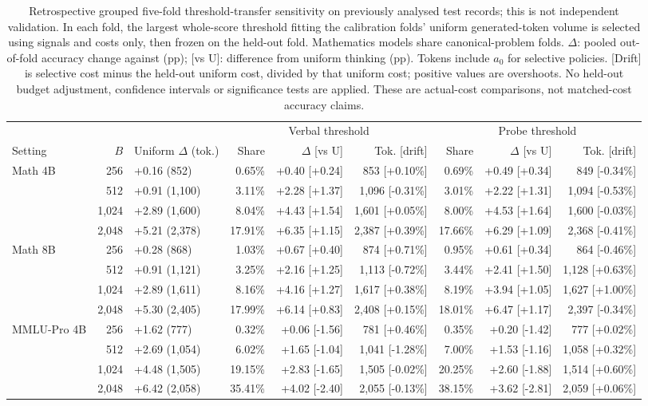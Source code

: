 \begin{table}[t]
\centering\scriptsize
\setlength{\tabcolsep}{3pt}
\begin{tabular}{lrlrrrrrr}
\toprule
& & & \multicolumn{3}{c}{Verbal threshold} & \multicolumn{3}{c}{Probe threshold} \\
\cmidrule(lr){4-6}\cmidrule(lr){7-9}
Setting & $B$ & Uniform $\Delta$ (tok.) & Share & $\Delta$ [vs U] & Tok. [drift] & Share & $\Delta$ [vs U] & Tok. [drift] \\
\midrule
Math 4B & 256 & +0.16 (852) & 0.65\% & +0.40 [+0.24] & 853 [+0.10\%] & 0.69\% & +0.49 [+0.34] & 849 [-0.34\%] \\
 & 512 & +0.91 (1,100) & 3.11\% & +2.28 [+1.37] & 1,096 [-0.31\%] & 3.01\% & +2.22 [+1.31] & 1,094 [-0.53\%] \\
 & 1,024 & +2.89 (1,600) & 8.04\% & +4.43 [+1.54] & 1,601 [+0.05\%] & 8.00\% & +4.53 [+1.64] & 1,600 [-0.03\%] \\
 & 2,048 & +5.21 (2,378) & 17.91\% & +6.35 [+1.15] & 2,387 [+0.39\%] & 17.66\% & +6.29 [+1.09] & 2,368 [-0.41\%] \\
\midrule
Math 8B & 256 & +0.28 (868) & 1.03\% & +0.67 [+0.40] & 874 [+0.71\%] & 0.95\% & +0.61 [+0.34] & 864 [-0.46\%] \\
 & 512 & +0.91 (1,121) & 3.25\% & +2.16 [+1.25] & 1,113 [-0.72\%] & 3.44\% & +2.41 [+1.50] & 1,128 [+0.63\%] \\
 & 1,024 & +2.89 (1,611) & 8.16\% & +4.16 [+1.27] & 1,617 [+0.38\%] & 8.19\% & +3.94 [+1.05] & 1,627 [+1.00\%] \\
 & 2,048 & +5.30 (2,405) & 17.99\% & +6.14 [+0.83] & 2,408 [+0.15\%] & 18.01\% & +6.47 [+1.17] & 2,397 [-0.34\%] \\
\midrule
MMLU-Pro 4B & 256 & +1.62 (777) & 0.32\% & +0.06 [-1.56] & 781 [+0.46\%] & 0.35\% & +0.20 [-1.42] & 777 [+0.02\%] \\
 & 512 & +2.69 (1,054) & 6.02\% & +1.65 [-1.04] & 1,041 [-1.28\%] & 7.00\% & +1.53 [-1.16] & 1,058 [+0.32\%] \\
 & 1,024 & +4.48 (1,505) & 19.15\% & +2.83 [-1.65] & 1,505 [-0.02\%] & 20.25\% & +2.60 [-1.88] & 1,514 [+0.60\%] \\
 & 2,048 & +6.42 (2,058) & 35.41\% & +4.02 [-2.40] & 2,055 [-0.13\%] & 38.15\% & +3.62 [-2.81] & 2,059 [+0.06\%] \\
\bottomrule
\end{tabular}
\caption{Retrospective grouped five-fold threshold-transfer sensitivity on previously analysed test records; this is not independent validation. In each fold, the largest whole-score threshold fitting the calibration folds' uniform generated-token volume is selected using signals and costs only, then frozen on the held-out fold. Mathematics models share canonical-problem folds. $\Delta$: pooled out-of-fold accuracy change against \KEEP{} (pp); [vs U]: difference from uniform thinking (pp). Tokens include $a_0$ for selective policies. [Drift] is selective cost minus the held-out uniform cost, divided by that uniform cost; positive values are overshoots. No held-out budget adjustment, confidence intervals or significance tests are applied. These are actual-cost comparisons, not matched-cost accuracy claims.}
\label{tab:crossfitv2}
\end{table}
